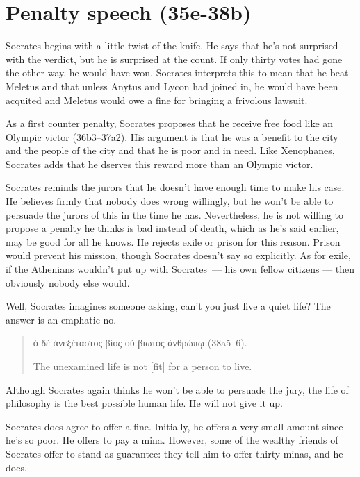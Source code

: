 \documentclass[11pt]{article}
\begin{document}

\section{Penalty speech (35e-38b)}

Socrates begins with a little twist of the knife.  He says that he's not surprised with the verdict, but he is surprised at the count. If only thirty votes had gone the other way, he would have won.  Socrates interprets this to mean that he beat Meletus and that unless Anytus and Lycon had joined in, he would have been acquited and Meletus would owe a fine for bringing a frivolous lawsuit.

As a first counter penalty, Socrates proposes that he receive free food like an Olympic victor (36b3--37a2).  His argument is that he was a benefit to the city and the people of the city and that he is poor and in need.  Like Xenophanes, Socrates adds that he dserves this reward more than an Olympic victor.

Socrates reminds the jurors that he doesn't have enough time to make his case.  He believes firmly that nobody does wrong willingly, but he won't be able to persuade the jurors of this in the time he has.  Nevertheless, he is not willing to propose a penalty he thinks is bad instead of death, which as he's said earlier, may be good for all he knows.  He rejects exile or prison for this reason.  Prison would prevent his mission, though Socrates doesn't say so explicitly.  As for exile, if the Athenians wouldn't put up with Socrates~--- his own fellow citizens --- then obviously nobody else would.

Well, Socrates imagines someone asking, can't you just live a quiet life?  The answer is an emphatic no.

\begin{quote}
    ὁ δὲ ἀνεξέταστος βίος οὐ βιωτὸς ἀνθρώπῳ (38a5--6).

    The unexamined life is not [fit] for a person to live.
\end{quote}

Although Socrates again thinks he won't be able to persuade the jury, the life of philosophy is the best possible human life.  He will not give it up.

Socrates does agree to offer a fine.  Initially, he offers a very small amount since he's so poor.  He offers to pay a mina.  However, some of the wealthy friends of Socrates offer to stand as guarantee: they tell him to offer thirty minas, and he does.
\end{document}
